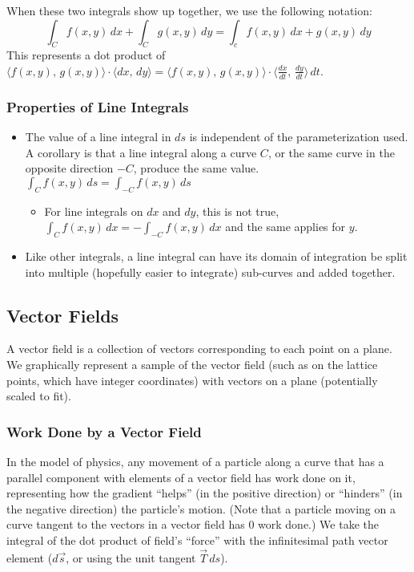 \documentclass{article}
\newcommand{\vect}[1]{\ensuremath{\overrightarrow{#1}}}
\begin{document}
When these two integrals show up together, we use the following notation:
$$\int_Cf(x,y)\,dx+\int_Cg(x,y)\,dy=\int_cf(x,y)\,dx+g(x,y)\,dy$$
This represents a dot product of $\langle f(x,y),\,g(x,y)\rangle\cdot\langle dx,\,dy\rangle=\langle f(x,y),\,g(x,y)\rangle\cdot\langle \frac{dx}{dt},\,\frac{dy}{dt}\rangle\,dt$.
\subsubsection{Properties of Line Integrals}
\begin{itemize}
    \item The value of a line integral in $ds$ is independent of the parameterization used. A corollary is that a line integral along a curve $C$, or the same curve in the opposite direction $-C$, produce the same value. $\int_C f(x,y)\,ds=\int_{-C}f(x,y)\,ds$
    \begin{itemize}
        \item For line integrals on $dx$ and $dy$, this is not true, $\int_Cf(x,y)\,dx=-\int_{-C}f(x,y)\,dx$ and the same applies for $y$.
    \end{itemize}
    \item Like other integrals, a line integral can have its domain of integration be split into multiple (hopefully easier to integrate) sub-curves and added together.
\end{itemize}

\subsection{Vector Fields}
A vector field is a collection of vectors corresponding to each point on a plane. We graphically represent a sample of the vector field (such as on the lattice points, which have integer coordinates) with vectors on a plane (potentially scaled to fit).
\subsubsection{Work Done by a Vector Field}
In the model of physics, any movement of a particle along a curve that has a parallel component with elements of a vector field has work done on it, representing how the gradient ``helps'' (in the positive direction) or ``hinders'' (in the negative direction) the particle's motion. (Note that a particle moving on a curve tangent to the vectors in a vector field has 0 work done.) We take the integral of the dot product of field's ``force'' with the infinitesimal path vector element ($d\vect{s}$, or using the unit tangent $\vect{T}\,ds$).
\end{document}
